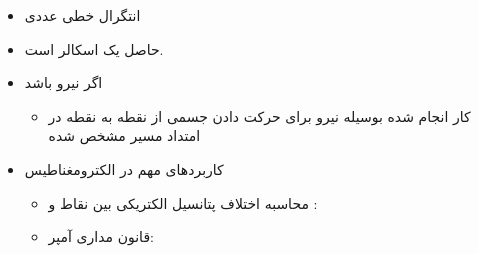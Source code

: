 \begin{ELunit}

\begin{itemize}
\tightlist
\item
  انتگرال خطی عددی
\end{itemize}


\begin{itemize}
\tightlist
\item
  حاصل یک اسکالر است.
\item
  اگر  نیرو باشد

  \begin{itemize}
  \tightlist
  \item
    کار انجام شده بوسیله نیرو برای حرکت دادن جسمی از نقطه  به نقطه  در امتداد مسیر مشخص شده 
  \end{itemize}
\item
  کاربردهای مهم در الکترومغناطیس

  \begin{itemize}
  \item
    محاسبه اختلاف پتانسیل الکتریکی بین نقاط  و :
  \item
    قانون مداری آمپر:
  \end{itemize}
\end{itemize}

\end{ELunit}


